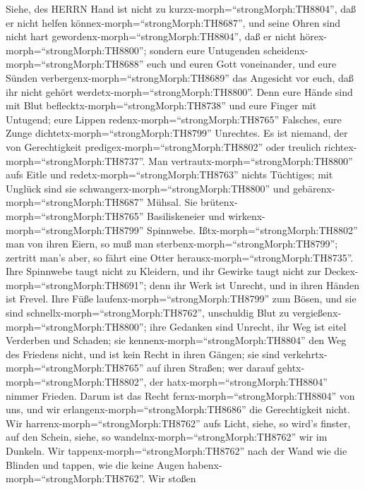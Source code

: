  Siehe, des HERRN Hand ist nicht zu
kurzx-morph=``strongMorph:TH8804'', daß er nicht helfen
könnex-morph=``strongMorph:TH8687'', und seine Ohren sind nicht hart
gewordenx-morph=``strongMorph:TH8804'', daß er nicht
hörex-morph=``strongMorph:TH8800'';  sondern eure Untugenden
scheidenx-morph=``strongMorph:TH8688'' euch und euren Gott voneinander,
und eure Sünden verbergenx-morph=``strongMorph:TH8689'' das Angesicht
vor euch, daß ihr nicht gehört werdetx-morph=``strongMorph:TH8800''.
 Denn eure Hände sind mit Blut
beflecktx-morph=``strongMorph:TH8738'' und eure Finger mit Untugend;
eure Lippen redenx-morph=``strongMorph:TH8765'' Falsches, eure Zunge
dichtetx-morph=``strongMorph:TH8799'' Unrechtes.  Es ist
niemand, der von Gerechtigkeit predigex-morph=``strongMorph:TH8802''
oder treulich richtex-morph=``strongMorph:TH8737''. Man
vertrautx-morph=``strongMorph:TH8800'' aufs Eitle und
redetx-morph=``strongMorph:TH8763'' nichts Tüchtiges; mit Unglück sind
sie schwangerx-morph=``strongMorph:TH8800'' und
gebärenx-morph=``strongMorph:TH8687'' Mühsal.  Sie
brütenx-morph=``strongMorph:TH8765'' Basiliskeneier und
wirkenx-morph=``strongMorph:TH8799'' Spinnwebe.
Ißtx-morph=``strongMorph:TH8802'' man von ihren Eiern, so muß man
sterbenx-morph=``strongMorph:TH8799''; zertritt man's aber, so fährt
eine Otter herausx-morph=``strongMorph:TH8735''.  Ihre
Spinnwebe taugt nicht zu Kleidern, und ihr Gewirke taugt nicht zur
Deckex-morph=``strongMorph:TH8691''; denn ihr Werk ist Unrecht, und in
ihren Händen ist Frevel.  Ihre Füße
laufenx-morph=``strongMorph:TH8799'' zum Bösen, und sie sind
schnellx-morph=``strongMorph:TH8762'', unschuldig Blut zu
vergießenx-morph=``strongMorph:TH8800''; ihre Gedanken sind Unrecht, ihr
Weg ist eitel Verderben und Schaden;  sie
kennenx-morph=``strongMorph:TH8804'' den Weg des Friedens nicht, und ist
kein Recht in ihren Gängen; sie sind
verkehrtx-morph=``strongMorph:TH8765'' auf ihren Straßen; wer darauf
gehtx-morph=``strongMorph:TH8802'', der
hatx-morph=``strongMorph:TH8804'' nimmer Frieden.  Darum ist
das Recht fernx-morph=``strongMorph:TH8804'' von uns, und wir
erlangenx-morph=``strongMorph:TH8686'' die Gerechtigkeit nicht. Wir
harrenx-morph=``strongMorph:TH8762'' aufs Licht, siehe, so wird's
finster, auf den Schein, siehe, so wandelnx-morph=``strongMorph:TH8762''
wir im Dunkeln.  Wir tappenx-morph=``strongMorph:TH8762''
nach der Wand wie die Blinden und tappen, wie die keine Augen
habenx-morph=``strongMorph:TH8762''. Wir stoßen
